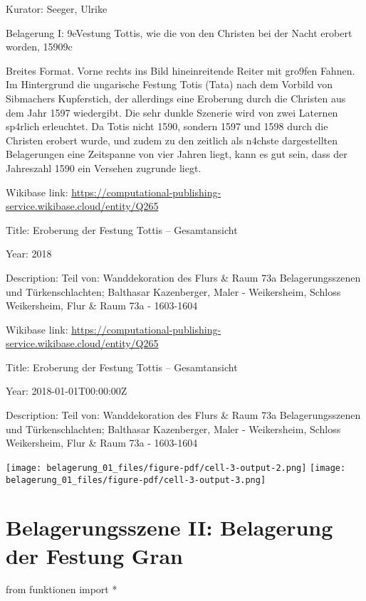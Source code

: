 \documentclass[
  letterpaper,
]{book}
\newenvironment{Shaded}{\begin{snugshade}}{\end{snugshade}}
\newcommand{\ImportTok}[1]{\textcolor[rgb]{0.00,0.46,0.62}{#1}}
\newcommand{\NormalTok}[1]{\textcolor[rgb]{0.00,0.23,0.31}{#1}}
\newcommand{\OperatorTok}[1]{\textcolor[rgb]{0.37,0.37,0.37}{#1}}
\begin{document}
Kurator: Seeger, Ulrike

Belagerung I: \x9eVestung Tottis, wie die von den Christen bei
der Nacht erobert worden, 1590\x9c

Breites Format. Vorne rechts ins Bild hineinreitende Reiter mit
gro\x9fen Fahnen. Im Hintergrund die ungarische Festung Totis (Tata)
nach dem Vorbild von Sibmachers Kupferstich, der allerdings eine
Eroberung durch die Christen aus dem Jahr 1597 wiedergibt. Die sehr
dunkle Szenerie wird von zwei Laternen sp\xa4rlich erleuchtet. Da
Totis nicht 1590, sondern 1597 und 1598 durch die Christen erobert
wurde, und zudem zu den zeitlich als n\xa4chste dargestellten
Belagerungen eine Zeitspanne von vier Jahren liegt, kann es gut sein,
dass der Jahreszahl 1590 ein Versehen zugrunde liegt.

Wikibase link:
\url{https://computational-publishing-service.wikibase.cloud/entity/Q265}

Title: Eroberung der Festung Tottis -- Gesamtansicht

Year: 2018

Description: Teil von: Wanddekoration des Flurs \& Raum 73a
Belagerungsszenen und Türkenschlachten; Balthasar Kazenberger, Maler -
Weikersheim, Schloss Weikersheim, Flur \& Raum 73a - 1603-1604

Wikibase link:
\url{https://computational-publishing-service.wikibase.cloud/entity/Q265}

Title: Eroberung der Festung Tottis -- Gesamtansicht

Year: 2018-01-01T00:00:00Z

Description: Teil von: Wanddekoration des Flurs \& Raum 73a
Belagerungsszenen und Türkenschlachten; Balthasar Kazenberger, Maler -
Weikersheim, Schloss Weikersheim, Flur \& Raum 73a - 1603-1604

\texttt{[image: belagerung\_01\_files/figure-pdf/cell-3-output-2.png]}
\texttt{[image: belagerung\_01\_files/figure-pdf/cell-3-output-3.png]}


\chapter{Belagerungsszene II: Belagerung der Festung
Gran}\label{belagerungsszene-ii-belagerung-der-festung-gran}

\begin{Shaded}
\begin{Highlighting}[]
\ImportTok{from}\NormalTok{ funktionen }\ImportTok{import} \OperatorTok{*}
\end{Highlighting}
\end{Shaded}
\end{document}
